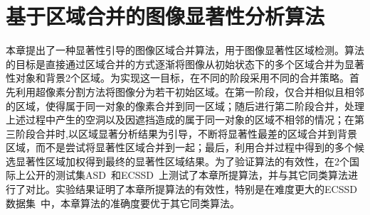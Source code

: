 

\chapter{基于区域合并的图像显著性分析算法}
\label{ch2:SGRM}
本章提出了一种显著性引导的图像区域合并算法，用于图像显著性区域检测。算法的目标是直接通过区域合并的方式逐渐将图像从初始状态下的多个区域合并为显著性对象和背景2个区域。为实现这一目标，在不同的阶段采用不同的合并策略。首先利用超像素分割方法将图像分为若干初始区域。在第一阶段，仅合并相似且相邻的区域，使得属于同一对象的像素合并到同一区域；随后进行第二阶段合并，处理上述过程中产生的空洞以及因遮挡造成的属于同一对象的区域不相邻的情况；在第三阶段合并时,以区域显著分析结果为引导，不断将显著性最差的区域合并到背景区域，而不是尝试将显著性区域合并到一起；最后，利用合并过程中得到的多个候选显著性区域加权得到最终的显著性区域结果。为了验证算法的有效性，在2个国际上公开的测试集ASD~\cite{Achanta08}和ECSSD~\cite{ECSSD}上测试了本章所提算法，并与其它同类算法进行了对比。实验结果证明了本章所提算法的有效性，特别是在难度更大的ECSSD数据集~\cite{ECSSD}中，本章算法的准确度要优于其它同类算法。
